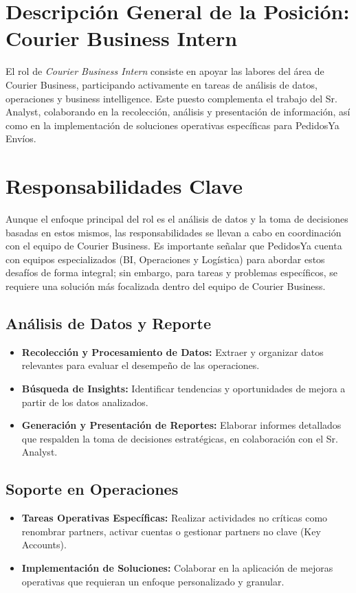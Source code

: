 \section{Descripción General de la Posición: Courier Business Intern \label{sec:sec1}}
El rol de \textit{Courier Business Intern} consiste en apoyar las labores del área de Courier Business, participando activamente en tareas de análisis de datos, operaciones y business intelligence. Este puesto complementa el trabajo del Sr. Analyst, colaborando en la recolección, análisis y presentación de información, así como en la implementación de soluciones operativas específicas para PedidosYa Envíos.

\section{Responsabilidades Clave \label{sec:sec2}}
Aunque el enfoque principal del rol es el análisis de datos y la toma de decisiones basadas en estos mismos, las responsabilidades se llevan a cabo en coordinación con el equipo de Courier Business. Es importante señalar que PedidosYa cuenta con equipos especializados (BI, Operaciones y Logística) para abordar estos desafíos de forma integral; sin embargo, para tareas y problemas específicos, se requiere una solución más focalizada dentro del equipo de Courier Business.

\subsection{Análisis de Datos y Reporte}
\begin{itemize}
	\item \textbf{Recolección y Procesamiento de Datos:} Extraer y organizar datos relevantes para evaluar el desempeño de las operaciones.
	\item \textbf{Búsqueda de Insights:} Identificar tendencias y oportunidades de mejora a partir de los datos analizados.
	\item \textbf{Generación y Presentación de Reportes:} Elaborar informes detallados que respalden la toma de decisiones estratégicas, en colaboración con el Sr. Analyst.
\end{itemize}

\subsection{Soporte en Operaciones}
\begin{itemize}
	\item \textbf{Tareas Operativas Específicas:} Realizar actividades no críticas como renombrar partners, activar cuentas o gestionar partners no clave (Key Accounts).
	\item \textbf{Implementación de Soluciones:} Colaborar en la aplicación de mejoras operativas que requieran un enfoque personalizado y granular.
\end{itemize}

